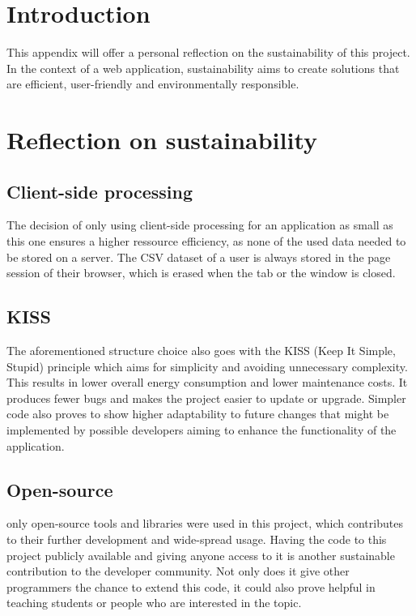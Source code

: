 
\section{Introduction}
This appendix will offer a personal reflection on the sustainability of this project. In the context of a web application, sustainability aims to create solutions that are efficient, user-friendly and environmentally responsible.

\section{Reflection on sustainability}
\subsection{Client-side processing}
The decision of only using client-side processing for an application as small as this one ensures a higher ressource efficiency, as none of the used data needed to be stored on a server. The CSV dataset of a user is always stored in the page session of their browser, which is erased when the tab or the window is closed. 

\subsection{KISS}
The aforementioned structure choice also goes with the KISS (Keep It Simple, Stupid) principle which aims for simplicity and avoiding unnecessary complexity. This results in lower overall energy consumption and lower maintenance costs. It produces fewer bugs and makes the project easier to update or upgrade. Simpler code also proves to show higher adaptability to future changes that might be implemented by possible developers aiming to enhance the functionality of the application.

\subsection{Open-source}
only open-source tools and libraries were used in this project, which contributes to their further development and wide-spread usage. Having the code to this project publicly available and giving anyone access to it is another sustainable contribution to the developer community. Not only does it give other programmers the chance to extend this code, it could also prove helpful in teaching students or people who are interested in the topic.

